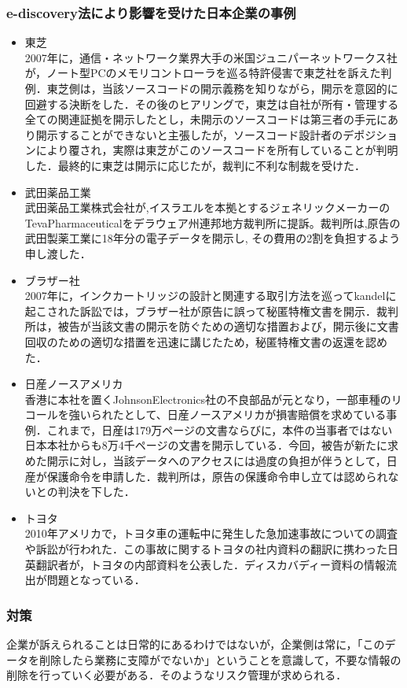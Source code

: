 \subsubsection{e-discovery法により影響を受けた日本企業の事例}
\begin{itemize}
\item 東芝\\
2007年に，通信・ネットワーク業界大手の米国ジュニパーネットワークス社が，ノート型PCのメモリコントローラを巡る特許侵害で東芝社を訴えた判例．東芝側は，当該ソースコードの開示義務を知りながら，開示を意図的に回避する決断をした．その後のヒアリングで，東芝は自社が所有・管理する全ての関連証拠を開示したとし，未開示のソースコードは第三者の手元にあり開示することができないと主張したが，ソースコード設計者のデポジションにより覆され，実際は東芝がこのソースコードを所有していることが判明した．最終的に東芝は開示に応じたが，裁判に不利な制裁を受けた\cite{ediscoveryblog}．
\item 武田薬品工業\\
武田薬品工業株式会社が,イスラエルを本拠とするジェネリックメーカーのTevaPharmaceuticalをデラウェア州連邦地方裁判所に提訴。裁判所は,原告の武田製薬工業に18年分の電子データを開示し,  その費用の2割を負担するよう申し渡した\cite{ediscoveryblog}．
\item ブラザー社\\
2007年に，インクカートリッジの設計と関連する取引方法を巡ってkandelに起こされた訴訟では，ブラザー社が原告に誤って秘匿特権文書を開示．裁判所は，被告が当該文書の開示を防ぐための適切な措置および，開示後に文書回収のための適切な措置を迅速に講じたため，秘匿特権文書の返還を認めた\cite{ediscoveryblog}．
\item 日産ノースアメリカ\\
香港に本社を置くJohnsonElectronics社の不良部品が元となり，一部車種のリコールを強いられたとして、日産ノースアメリカが損害賠償を求めている事例．これまで，日産は179万ページの文書ならびに，本件の当事者ではない日本本社からも8万4千ページの文書を開示している．今回，被告が新たに求めた開示に対し，当該データへのアクセスには過度の負担が伴うとして，日産が保護命令を申請した．裁判所は，原告の保護命令申し立ては認められないとの判決を下した\cite{ediscoveryblog}．
\item トヨタ\\
2010年アメリカで，トヨタ車の運転中に発生した急加速事故についての調査や訴訟が行われた．この事故に関するトヨタの社内資料の翻訳に携わった日英翻訳者が，トヨタの内部資料を公表した．ディスカバディー資料の情報流出が問題となっている\cite{ediscoveryblog}．
\end{itemize}


\subsubsection{対策}
企業が訴えられることは日常的にあるわけではないが，企業側は常に，「このデータを削除したら業務に支障がでないか」ということを意識して，不要な情報の削除を行っていく必要がある．そのようなリスク管理が求められる．
